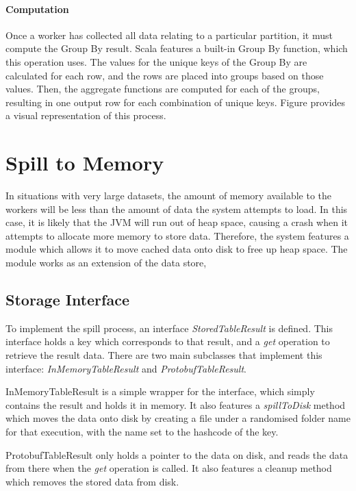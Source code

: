 
\paragraph{Computation}
Once a worker has collected all data relating to a particular partition, it must compute the Group By result. Scala features a built-in Group By function, which this operation uses. The values for the unique keys of the Group By are calculated for each row, and the rows are placed into groups based on those values. Then, the aggregate functions are computed for each of the groups, resulting in one output row for each combination of unique keys. Figure  provides a visual representation of this process.


\section{Spill to Memory}
In situations with very large datasets, the amount of memory available to the workers will be less than the amount of data the system attempts to load. In this case, it is likely that the JVM will run out of heap space, causing a crash when it attempts to allocate more memory to store data. Therefore, the system features a module which allows it to move cached data onto disk to free up heap space. The module works as an extension of the data store, 

\subsection{Storage Interface}
To implement the spill process, an interface \textit{StoredTableResult} is defined. This interface holds a key which corresponds to that result, and a \textit{get} operation to retrieve the result data. There are two main subclasses that implement this interface: \textit{InMemoryTableResult} and \textit{ProtobufTableResult}. 

InMemoryTableResult is a simple wrapper for the interface, which simply contains the result and holds it in memory. It also features a \textit{spillToDisk} method which moves the data onto disk by creating a file under a randomised folder name for that execution, with the name set to the hashcode of the key. 

ProtobufTableResult only holds a pointer to the data on disk, and reads the data from there when the \textit{get} operation is called. It also features a cleanup method which removes the stored data from disk.

